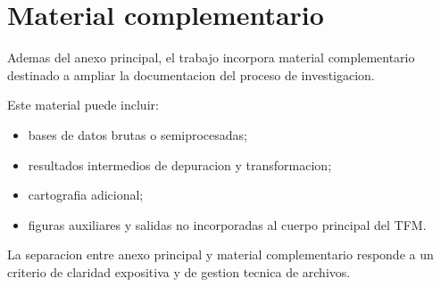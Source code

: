 \section{Material complementario}

Ademas del anexo principal, el trabajo incorpora material complementario destinado a ampliar la documentacion del proceso de investigacion.

Este material puede incluir:

\begin{itemize}
    \item bases de datos brutas o semiprocesadas;
    \item resultados intermedios de depuracion y transformacion;
    \item cartografia adicional;
    \item figuras auxiliares y salidas no incorporadas al cuerpo principal del TFM.
\end{itemize}

La separacion entre anexo principal y material complementario responde a un criterio de claridad expositiva y de gestion tecnica de archivos.
